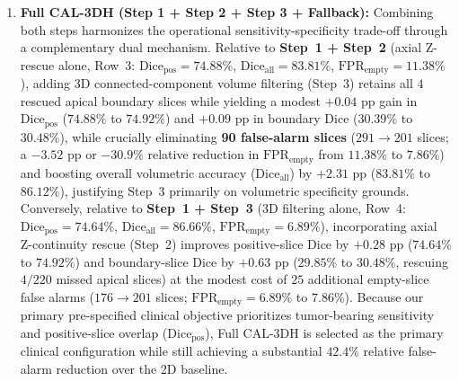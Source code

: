 \documentclass[preprint,12pt,authoryear]{elsarticle}
\begin{document}
\begin{enumerate}
\item \textbf{Full CAL-3DH (Step 1 + Step 2 + Step 3 + Fallback):} Combining both steps harmonizes the operational sensitivity-specificity trade-off through a complementary dual mechanism. Relative to \textbf{Step~1 + Step~2} (axial Z-rescue alone, Row~3: $\text{Dice}_{\text{pos}} = 74.88\%$, $\text{Dice}_{\text{all}} = 83.81\%$, $\text{FPR}_{\text{empty}} = 11.38\%$), adding 3D connected-component volume filtering (Step~3) retains all $4$ rescued apical boundary slices while yielding a modest $+0.04\text{ pp}$ gain in $\text{Dice}_{\text{pos}}$ ($74.88\%$ to $74.92\%$) and $+0.09\text{ pp}$ in boundary Dice ($30.39\%$ to $30.48\%$), while crucially eliminating \textbf{90 false-alarm slices} ($291 \to 201$ slices; a $-3.52\text{ pp}$ or $-30.9\%$ relative reduction in $\text{FPR}_{\text{empty}}$ from $11.38\%$ to $7.86\%$) and boosting overall volumetric accuracy ($\text{Dice}_{\text{all}}$) by $+2.31\text{ pp}$ ($83.81\%$ to $86.12\%$), justifying Step~3 primarily on volumetric specificity grounds. Conversely, relative to \textbf{Step~1 + Step~3} (3D filtering alone, Row~4: $\text{Dice}_{\text{pos}} = 74.64\%$, $\text{Dice}_{\text{all}} = 86.66\%$, $\text{FPR}_{\text{empty}} = 6.89\%$), incorporating axial Z-continuity rescue (Step~2) improves positive-slice Dice by $+0.28\text{ pp}$ ($74.64\%$ to $74.92\%$) and boundary-slice Dice by $+0.63\text{ pp}$ ($29.85\%$ to $30.48\%$, rescuing $4/220$ missed apical slices) at the modest cost of $25$ additional empty-slice false alarms ($176 \to 201$ slices; $\text{FPR}_{\text{empty}} = 6.89\%$ to $7.86\%$). Because our primary pre-specified clinical objective prioritizes tumor-bearing sensitivity and positive-slice overlap ($\text{Dice}_{\text{pos}}$), Full CAL-3DH is selected as the primary clinical configuration while still achieving a substantial $42.4\%$ relative false-alarm reduction over the 2D baseline.
\end{enumerate}
\end{document}
